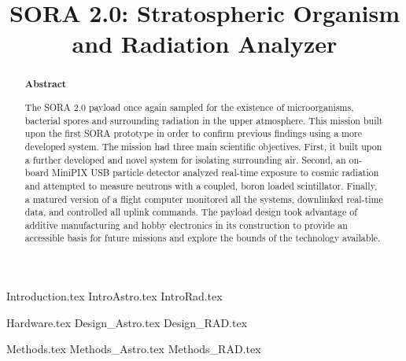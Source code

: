 \documentclass[aps,superscriptaddress,floatfix,nofootinbib,showpacs,amsmath,amssymb,altaffilletter,floatfix,onecolumn]{revtex4-1}
\begin{document}
\title{SORA 2.0: Stratospheric Organism and Radiation Analyzer}

\begin{abstract}
\begin{center}
{\bf Abstract}
\end{center}
\frenchspacing
The SORA 2.0 payload once again sampled for the existence of microorganisms, bacterial spores and surrounding radiation in the upper atmosphere. 
This mission built upon the first SORA prototype \cite{SORA} in order to confirm previous findings using a more developed system.
%
%
The mission had three main scientific objectives. 
%
First, it built upon a further developed and novel system for isolating surrounding air. 
%
Second, an on-board MiniPIX USB particle detector analyzed real-time exposure to cosmic radiation and attempted to measure neutrons with a coupled, boron loaded scintillator. 
%
Finally, a matured version of a flight computer monitored all the systems, downlinked real-time data, and controlled all uplink commands.
%
The payload design took advantage of additive manufacturing and hobby electronics in its construction to provide an accessible basis for future missions and explore the bounds of the technology available. 

\newpage %
\end{abstract}

\setlength{\parindent}{1em}
\setdefaultleftmargin{1em}{1em}{}{}{}{}
\setcounter{page}{0}\thispagestyle{empty}
\maketitle
\onecolumngrid
\setcounter{tocdepth}{2}
\setcounter{page}{0}\thispagestyle{empty}
\tableofcontents
\setcounter{page}{0}\thispagestyle{empty}
\newpage
\onecolumngrid

{Introduction.tex}
{IntroAstro.tex}
{IntroRad.tex}

{Hardware.tex}
{Design_Astro.tex}
{Design_RAD.tex}

{Methods.tex}
{Methods_Astro.tex}
{Methods_RAD.tex}
\end{document}
